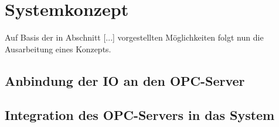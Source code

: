 % 
% 
% 
% 
% 
% 
% 
% 

\section{Systemkonzept%
  \label{sec:3-konzeption}}
Auf Basis der in Abschnitt [...] vorgestellten Möglichkeiten folgt nun die Ausarbeitung eines Konzepts.

\subsection{Anbindung der IO an den OPC-Server%
     \label{sec:3-anbindung}}

\subsection{Integration des OPC-Servers in das System%
     \label{sec:3-integration}}
